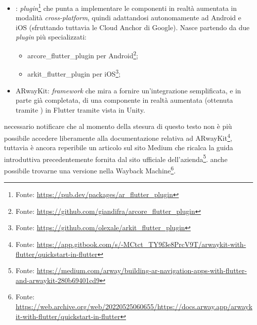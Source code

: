 \begin{itemize}
    \item \aplug{}: \textit{plugin}\footnote{Fonte: \url{https://pub.dev/packages/ar_flutter_plugin}} che punta a implementare le componenti in realtà aumentata in modalità \textit{cross-platform}, quindi adattandosi autonomamente ad Android e iOS (sfruttando tuttavia le Cloud Anchor di Google). Nasce partendo da due \textit{plugin} più specializzati: 
    \begin{itemize}
        \item arcore\_flutter\_plugin per Android\footnote{Fonte: \url{https://github.com/giandifra/arcore_flutter_plugin}};
        \item arkit\_flutter\_plugin per iOS\footnote{Fonte: \url{https://github.com/olexale/arkit_flutter_plugin}};
    \end{itemize}
    \item ARwayKit: \textit{framework} che mira a fornire un'integrazione semplificata, e in parte già completata, di una componente in realtà aumentata (ottenuta tramite \asa{}) in Flutter tramite vista in Unity.
\end{itemize}

\e{} necessario notificare che al momento della stesura di questo testo non è più possibile accedere liberamente alla documentazione relativa ad ARwayKit\footnote{Fonte: \url{https://app.gitbook.com/s/-MCtct_TY9f3e8PrcV9T/arwaykit-with-flutter/quickstart-in-flutter}}, tuttavia è ancora reperibile un articolo sul sito Medium che ricalca la guida introduttiva precedentemente fornita dal sito ufficiale dell'azienda\footnote{Fonte: \url{https://medium.com/arway/building-ar-navigation-apps-with-flutter-and-arwaykit-280b69401cd9}}. 
\e{} anche possibile trovarne una versione nella Wayback Machine\footnote{Fonte: \url{https://web.archive.org/web/20220525060655/https://docs.arway.app/arwaykit-with-flutter/quickstart-in-flutter}}.

